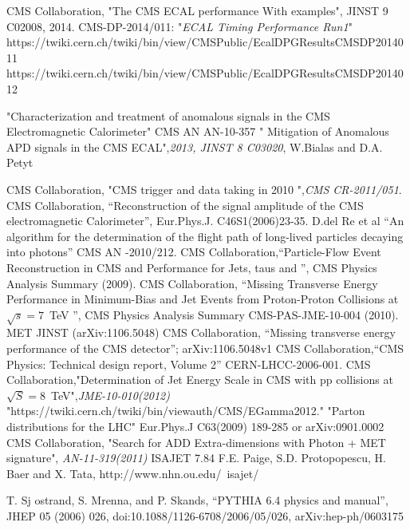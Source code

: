 \begin{thebibliography}{9}
CMS Collaboration, "The CMS ECAL performance With examples", JINST 9 C02008, 2014.
 CMS-DP-2014/011: "\textit{ECAL Timing Performance Run1}"
 https://twiki.cern.ch/twiki/bin/view/CMSPublic/EcalDPGResultsCMSDP2014011
https://twiki.cern.ch/twiki/bin/view/CMSPublic/EcalDPGResultsCMSDP2014012


 "Characterization and treatment of anomalous signals in the CMS Electromagnetic Calorimeter" CMS AN AN-10-357
 " Mitigation of Anomalous APD signals in the CMS ECAL",\textit{2013, JINST 8 C03020}, W.Bialas and D.A. Petyt

CMS Collaboration, "CMS trigger and data taking in 2010 ",\emph{CMS CR-2011/051}.
CMS Collaboration, ``Reconstruction of the signal amplitude of the CMS electromagnetic Calorimeter'', Eur.Phys.J. C46S1(2006)23-35.
 D.del Re et al ``An algorithm for the determination of the flight path of long-lived particles decaying into photons'' CMS AN -2010/212.
CMS Collaboration,``Particle-Flow Event Reconstruction in CMS and Performance for Jets, taus and \ETslash'', CMS Physics Analysis Summary (2009).
CMS Collaboration, “Missing Transverse Energy Performance in Minimum-Bias and Jet Events from Proton-Proton Collisions at $\sqrt{s} =7$~TeV ”, CMS Physics Analysis Summary CMS-PAS-JME-10-004 (2010).
MET JINST (arXiv:1106.5048)
CMS Collaboration, ``Missing transverse energy performance of the CMS detector''; arXiv:1106.5048v1
CMS Collaboration,``CMS Physics: Technical design report, Volume 2'' CERN-LHCC-2006-001.
 CMS Collaboration,"Determination of Jet Energy Scale in CMS with pp collisions at $\sqrt{S} = 8$~TeV",\textit{JME-10-010(2012)}
 "https://twiki.cern.ch/twiki/bin/viewauth/CMS/EGamma2012."
 "Parton distributions for the LHC" Eur.Phys.J C63(2009) 189-285 or arXiv:0901.0002
 CMS Collaboration, "Search for ADD Extra-dimensions with Photon + MET signature", \textit{AN-11-319(2011)}
 ISAJET 7.84 F.E. Paige, S.D. Protopopescu, H. Baer and X. Tata, http://www.nhn.ou.edu/~isajet/

 T. Sj ostrand, S. Mrenna, and P. Skands, “PYTHIA 6.4 physics and manual”, JHEP 05 (2006) 026, doi:10.1088/1126-6708/2006/05/026, arXiv:hep-ph/0603175


\end{thebibliography}
